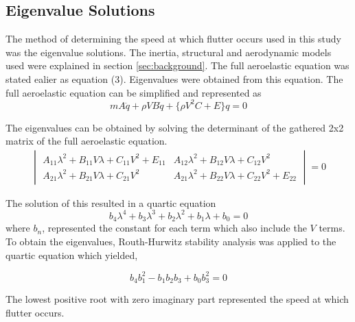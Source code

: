 \documentclass[11pt]{article}
\begin{document}
\subsection{Eigenvalue Solutions}
\label{sec:eig}
The method of determining the speed at which flutter occurs used in this study was the eigenvalue solutions. The inertia, structural and aerodynamic models used were explained in section \ref{sec:background}. The full aeroelastic equation was stated ealier as equation (3). Eigenvalues were obtained from this equation. The full aeroelastic equation can be simplified and represented as\\
\begin{equation}\label{eq:simplified-aeroe}
    mA\ddot{q}+\rho VB\dot{q}+\{\rho V^2 C+E\}q = 0
\end{equation}

The eigenvalues can be obtained by solving the determinant of the gathered 2x2 matrix of the full aeroelastic equation.\\

\begin{equation}
    \begin{gathered}
    \begin{vmatrix} A_{11}\lambda^2+B_{11}V\lambda+C_{11}V^2+E_{11} & A_{12}\lambda^2+B_{12}V\lambda+C_{12}V^2\\
    A_{21}\lambda^2+B_{21}V\lambda+C_{21}V^2&A_{21}\lambda^2+B_{22}V\lambda+C_{22}V^2+E_{22}\end{vmatrix}=0
    \end{gathered}
\end{equation}

The solution of this resulted in a quartic equation\\
\begin{equation}\label{eq:b_n}
    b_4\lambda^4+b_3\lambda^3+b_2\lambda^2+b_1\lambda+b_0 = 0
\end{equation}
where $b_n$, represented the constant for each term which also include the $V$ terms.\\

To obtain the eigenvalues, Routh-Hurwitz stability analysis was applied to the quartic equation which yielded,

\begin{equation}
    b_4b_1^2-b_1b_2b_3+b_0b_3^2 = 0
\end{equation}

The lowest positive root with zero imaginary part represented the speed at which flutter occurs.
\end{document}
